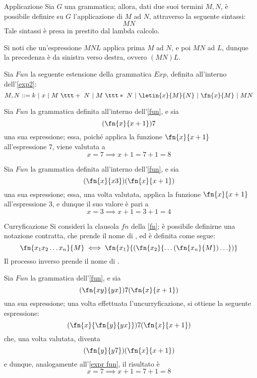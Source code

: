 \documentclass[a4paper, 12pt]{report}
\begin{document}
    \begin{frameddefn}{Applicazione}
        Sia $G$ una grammatica; allora, dati due suoi termini $M,N$, è possibile definire su $G$ l'applicazione di $M$ ad $N$, attraverso la seguente sintassi: $$MN$$ Tale sintassi è presa in prestito dal lambda calcolo.

        Si noti che un'espressione $MNL$ applica prima $M$ ad $N$, e poi $MN$ ad $L$, dunque la precedenza è da sinistra verso destra, ovvero $(MN)L$.
    \end{frameddefn}

    \begin{example}
        \label{fun}
        Sia $Fun$ la seguente estensione della grammatica $Exp$, definita all'interno dell'\cref{exp2}: $$M,N ::= k \ | \ x \ | \ M \ \ttt + \ N \ | \ M \ \ttt * \ N \ | \ \letin{x}{M}{N} \ | \ \fn{x}{M} \ | \ MN$$
    \end{example}

    \begin{example}
        Sia $Fun$ la grammatica definita all'interno dell'\cref{fun}, e sia $$(\fn{x}{x +1})7$$ una sua espressione; essa, poiché applica la funzione $\fn{x}{x+1}$ all'espressione 7, viene valutata a $$x = 7 \implies x + 1= 7 + 1 = 8$$
    \end{example}

    \begin{example}
        \label{expr fun}
        Sia $Fun$ la grammatica definita all'interno dell'\cref{fun}, e sia $$(\fn{x}{x3})(\fn{x}{x+1})$$ una sua espressione; essa, una volta valutata, applica la funzione $\fn{x}{x+1}$ all'espressione 3, e dunque il suo valore è pari a $$x = 3 \implies x + 1 = 3 + 1 = 4$$
    \end{example}

    \begin{framedobs}{Curryficazione}
        Si consideri la clausola $fn$ della \cref{fn}; è possibile definirne una notazione contratta, che prende il nome di , ed è definita come segue: $$\fn{x_1x_2 \ldots x_n}{M} \iff \fn{x_1}{(\fn{x_2}{\ldots (\fn{x_n}{M}) \ldots})}$$ Il processo inverso prende il nome di .
    \end{framedobs}

    \begin{example}[Curryficazioni]
        Sia $Fun$ la grammatica dell'\cref{fun}, e sia $$(\fn{xy}{yx})7(\fn{x}{x+1})$$ una sua espressione; una volta effettuata l'uncurryficazione, si ottiene la seguente espressione: $$(\fn{x}{\fn{y}{yx}})7(\fn{x}{x+1})$$ che, una volta valutata, diventa $$(\fn{y}{y7})(\fn{x}{x+1})$$ e dunque, analogamente all'\cref{expr fun}, il risultato è $$x= 7 \implies x+1 = 7 + 1= 8$$
    \end{example}
\end{document}
